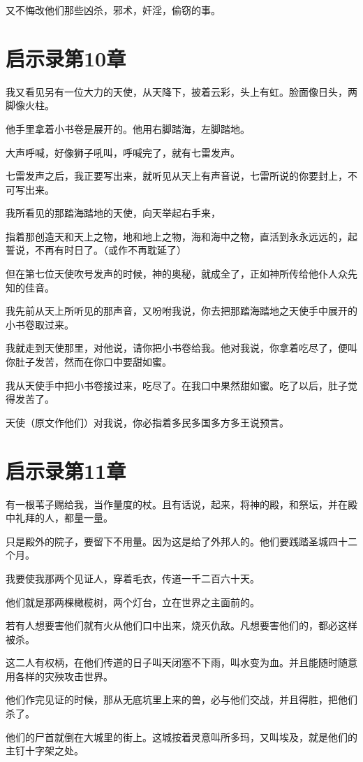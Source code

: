 \documentclass[12pt,oneside]{book}
\begin{document}
又不悔改他们那些凶杀，邪术，奸淫，偷窃的事。

\chapter{启示录第10章}
我又看见另有一位大力的天使，从天降下，披着云彩，头上有虹。脸面像日头，两脚像火柱。

他手里拿着小书卷是展开的。他用右脚踏海，左脚踏地。

大声呼喊，好像狮子吼叫，呼喊完了，就有七雷发声。

七雷发声之后，我正要写出来，就听见从天上有声音说，七雷所说的你要封上，不可写出来。

我所看见的那踏海踏地的天使，向天举起右手来，

指着那创造天和天上之物，地和地上之物，海和海中之物，直活到永永远远的，起誓说，不再有时日了。（或作不再耽延了）

但在第七位天使吹号发声的时候，神的奥秘，就成全了，正如神所传给他仆人众先知的佳音。

我先前从天上所听见的那声音，又吩咐我说，你去把那踏海踏地之天使手中展开的小书卷取过来。

我就走到天使那里，对他说，请你把小书卷给我。他对我说，你拿着吃尽了，便叫你肚子发苦，然而在你口中要甜如蜜。

我从天使手中把小书卷接过来，吃尽了。在我口中果然甜如蜜。吃了以后，肚子觉得发苦了。

天使（原文作他们）对我说，你必指着多民多国多方多王说预言。

\chapter{启示录第11章}
有一根苇子赐给我，当作量度的杖。且有话说，起来，将神的殿，和祭坛，并在殿中礼拜的人，都量一量。

只是殿外的院子，要留下不用量。因为这是给了外邦人的。他们要践踏圣城四十二个月。

我要使我那两个见证人，穿着毛衣，传道一千二百六十天。

他们就是那两棵橄榄树，两个灯台，立在世界之主面前的。

若有人想要害他们就有火从他们口中出来，烧灭仇敌。凡想要害他们的，都必这样被杀。

这二人有权柄，在他们传道的日子叫天闭塞不下雨，叫水变为血。并且能随时随意用各样的灾殃攻击世界。

他们作完见证的时候，那从无底坑里上来的兽，必与他们交战，并且得胜，把他们杀了。

他们的尸首就倒在大城里的街上。这城按着灵意叫所多玛，又叫埃及，就是他们的主钉十字架之处。
\end{document}
